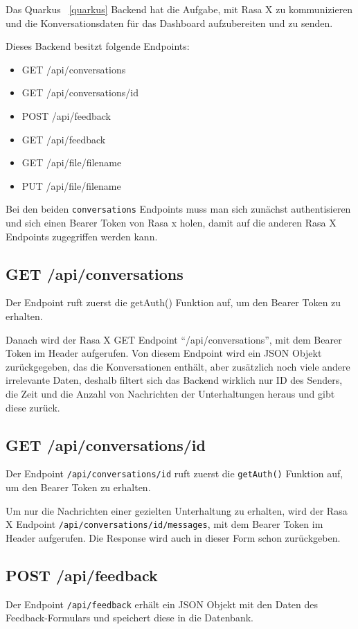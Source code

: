 Das Quarkus ~\ref{quarkus} Backend hat die Aufgabe, mit Rasa X zu kommunizieren und die Konversationsdaten für das Dashboard aufzubereiten und zu senden.

Dieses Backend besitzt folgende Endpoints:

\begin{itemize}
    \item GET /api/conversations
    \item GET /api/conversations/{id}
    \item POST /api/feedback
    \item GET /api/feedback
    \item GET /api/file/{filename}
    \item PUT /api/file/{filename}
\end{itemize}

Bei den beiden \texttt{conversations} Endpoints muss man sich zunächst authentisieren und sich einen Bearer Token von Rasa x holen, damit auf die anderen Rasa X Endpoints zugegriffen werden kann.

\subsection{GET /api/conversations}
Der Endpoint ruft zuerst die getAuth() Funktion auf, um den Bearer Token zu erhalten.

Danach wird der Rasa X GET Endpoint ``/api/conversations'', mit dem Bearer Token im Header aufgerufen.
Von diesem Endpoint wird ein JSON Objekt zurückgegeben, das die Konversationen enthält, aber zusätzlich noch viele andere irrelevante Daten, deshalb filtert sich das Backend wirklich nur ID des Senders, die Zeit und die Anzahl von Nachrichten der Unterhaltungen heraus und gibt diese zurück.

\subsection{GET /api/conversations/{id}}
Der Endpoint \texttt{/api/conversations/{id}} ruft zuerst die \texttt{getAuth()} Funktion auf, um den Bearer Token zu erhalten.

Um nur die Nachrichten einer gezielten Unterhaltung zu erhalten, wird der Rasa X Endpoint \texttt{/api/conversations/{id}/messages}, mit dem Bearer Token im Header aufgerufen.
Die Response wird auch in dieser Form schon zurückgeben.

\subsection{POST /api/feedback}
Der Endpoint \texttt{/api/feedback} erhält ein JSON Objekt mit den Daten des Feedback-Formulars und speichert diese in die Datenbank.

